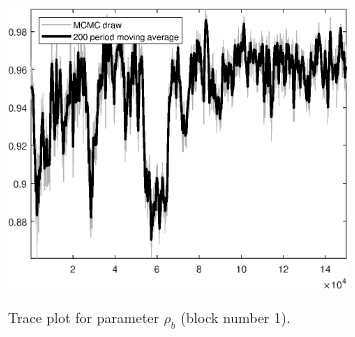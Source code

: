 \begin{figure}[H]
\centering
  \includegraphics[width=0.8\textwidth]{BRS_sectoral_KK/graphs/TracePlot_rho_b_blck_1}\\
    \caption{Trace plot for parameter ${\rho_b}$ (block number 1).}
\end{figure}
